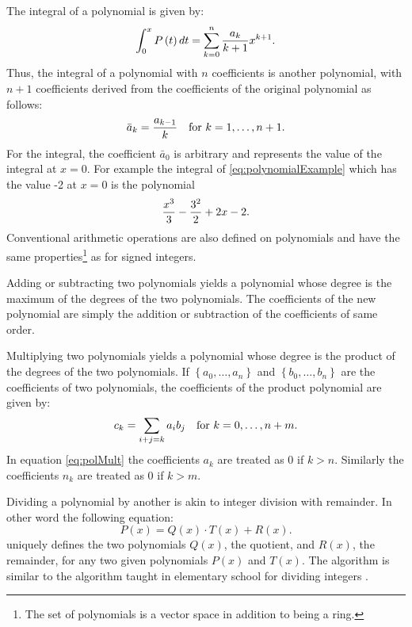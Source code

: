 \documentclass[twoside]{book}
\begin{document}
The integral of a polynomial is given by:
\begin{equation}
\int_0^xP\left(t\right)dt=\sum_{k=0}^{n}{a_k \over k+1} x^{k+1}.
\end{equation}
Thus, the integral of a polynomial with $n$ coefficients is
another polynomial, with $n+1$  coefficients derived from the
coefficients of the original polynomial as follows:
\begin{equation}
\bar{a}_k={a_{k-1}\over k}\mbox{\quad for $k=1,\ldots,n+1$}.
\end{equation}
For the integral, the coefficient $\bar{a}_0$ is arbitrary and
represents the value of the integral at $x=0$. For example the
integral of \ref{eq:polynomialExample} which has the value -2 at
$x=0$ is the polynomial
\begin{equation}
{x^3\over 3}-{3 ^2\over2}+2x-2.
\end{equation}
Conventional arithmetic operations are also defined on polynomials
and have the same properties\footnote{The set of polynomials is a
vector space in addition to being a ring.} as for signed integers.

Adding or subtracting two polynomials yields a polynomial whose
degree is the maximum of the degrees of the two polynomials. The
coefficients of the new polynomial are simply the addition or
subtraction of the coefficients of same order.

Multiplying two polynomials yields a polynomial whose degree is
the product of the degrees of the two polynomials. If $\left\{
a_0,\ldots,a_n \right\}$ and $\left\{ b_0,\ldots,b_n \right\}$ are
the coefficients of two polynomials, the coefficients of the
product polynomial are given by:
\begin{equation}
\label{eq:polMult} c_k = \sum_{i+j=k}a_i b_j \mbox{\quad for
$k=0,\ldots,n+m$}.
\end{equation}
In equation \ref{eq:polMult} the coefficients $a_k$ are treated as
0 if $k>n$. Similarly the coefficients $n_k$ are treated as 0 if
$k>m$.

Dividing a polynomial by another is akin to integer division with
remainder. In other word the following equation:
\begin{equation}
P\left(x\right)=Q\left(x\right)\cdot
T\left(x\right)+R\left(x\right).
\end{equation}
uniquely defines the two polynomials $Q\left(x\right)$, the
quotient, and $R\left(x\right)$, the remainder, for any two given
polynomials $P\left(x\right)$ and $T\left(x\right)$. The algorithm
is similar to the algorithm taught in elementary school for
dividing integers \cite{Knuth2}.
\end{document}
